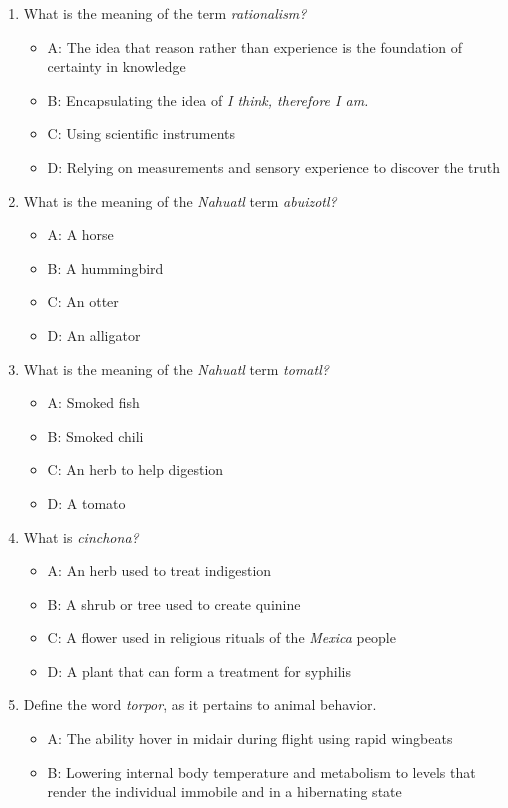 \documentclass[10pt]{article}
\begin{document}
\begin{enumerate}
\item What is the meaning of the term \textit{rationalism?}
\begin{itemize}
\item A: The idea that reason rather than experience is the foundation of certainty in knowledge
\item B: Encapsulating the idea of \textit{I think, therefore I am.}
\item C: Using scientific instruments
\item D: Relying on measurements and sensory experience to discover the truth
\end{itemize}
\item What is the meaning of the \textit{Nahuatl} term \textit{abuizotl?}
\begin{itemize}
\item A: A horse
\item B: A hummingbird
\item C: An otter
\item D: An alligator
\end{itemize}
\item What is the meaning of the \textit{Nahuatl} term \textit{tomatl?}
\begin{itemize}
\item A: Smoked fish
\item B: Smoked chili
\item C: An herb to help digestion
\item D: A tomato
\end{itemize}
\item What is \textit{cinchona?}
\begin{itemize}
\item A: An herb used to treat indigestion
\item B: A shrub or tree used to create quinine
\item C: A flower used in religious rituals of the \textit{Mexica} people
\item D: A plant that can form a treatment for syphilis
\end{itemize}
\item Define the word \textit{torpor}, as it pertains to animal behavior.
\begin{itemize}
\item A: The ability hover in midair during flight using rapid wingbeats
\item B: Lowering internal body temperature and metabolism to levels that render the individual immobile and in a hibernating state

\end{itemize}
\end{enumerate}
\end{document}

